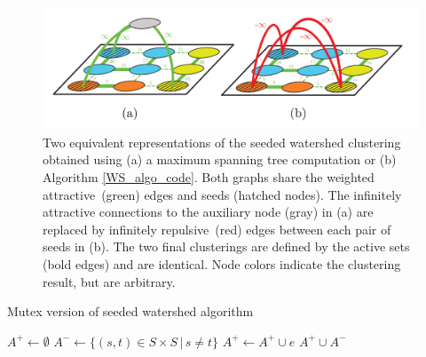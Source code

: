 \begin{figure}[t]
\centering
\includegraphics[width=\linewidth]{figures/MWS/images/seeded-WS.pdf}%
   \caption{Two equivalent representations of the seeded watershed clustering obtained using (a) a maximum spanning tree computation or (b) Algorithm \ref{WS_algo_code}. Both graphs share the weighted attractive~(green) edges and seeds (hatched nodes). The infinitely attractive connections to the auxiliary node (gray) in (a) are replaced by infinitely repulsive~(red) edges between each pair of seeds in (b). The two final clusterings are defined by the active sets (bold edges) and are identical. Node colors indicate the clustering result, but are arbitrary.}
\label{fig:WS_compare}
\end{figure}




\begin{algorithm}[t]
  \caption{Mutex version of seeded watershed algorithm}

  \begin{algorithmic}[1]
        \State $A^+ \leftarrow \emptyset$\; 
        \State $A^- \leftarrow \{ (s,t) \in S \times S \,|\, s \neq t \} $ %
                \State $A^+ \leftarrow A^+ \cup e$ 
            \EndIf
        \EndFor
        \State
        \Return $A^+ \cup A^-$
      \EndProcedure
  \end{algorithmic}
 \label{WS_algo_code}
\end{algorithm}


